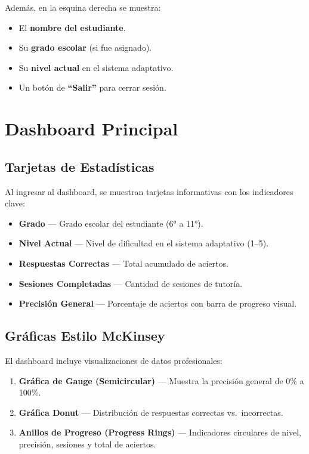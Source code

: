 \documentclass[12pt, a4paper, oneside]{book}
\begin{document}
Además, en la esquina derecha se muestra:
\begin{itemize}
    \item El \textbf{nombre del estudiante}.
    \item Su \textbf{grado escolar} (si fue asignado).
    \item Su \textbf{nivel actual} en el sistema adaptativo.
    \item Un botón de \textbf{``Salir''} para cerrar sesión.
\end{itemize}

\section{Dashboard Principal}

\subsection{Tarjetas de Estadísticas}

Al ingresar al dashboard, se muestran tarjetas informativas con los indicadores clave:

\begin{itemize}
    \item \textbf{Grado} — Grado escolar del estudiante (6° a 11°).
    \item \textbf{Nivel Actual} — Nivel de dificultad en el sistema adaptativo (1--5).
    \item \textbf{Respuestas Correctas} — Total acumulado de aciertos.
    \item \textbf{Sesiones Completadas} — Cantidad de sesiones de tutoría.
    \item \textbf{Precisión General} — Porcentaje de aciertos con barra de progreso visual.
\end{itemize}

\subsection{Gráficas Estilo McKinsey}

El dashboard incluye visualizaciones de datos profesionales:

\begin{enumerate}
    \item \textbf{Gráfica de Gauge (Semicircular)} — Muestra la precisión general de 0\% a 100\%.
    \item \textbf{Gráfica Donut} — Distribución de respuestas correctas vs.\ incorrectas.
    \item \textbf{Anillos de Progreso (Progress Rings)} — Indicadores circulares de nivel, precisión, sesiones y total de aciertos.
\end{enumerate}
\end{document}
